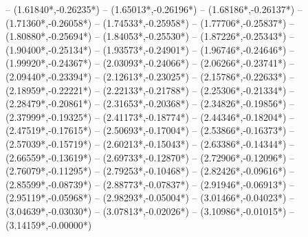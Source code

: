 {	-- ({1.61840*\dx},{-0.26235*\dy})
	-- ({1.65013*\dx},{-0.26196*\dy})
	-- ({1.68186*\dx},{-0.26137*\dy})
	-- ({1.71360*\dx},{-0.26058*\dy})
	-- ({1.74533*\dx},{-0.25958*\dy})
	-- ({1.77706*\dx},{-0.25837*\dy})
	-- ({1.80880*\dx},{-0.25694*\dy})
	-- ({1.84053*\dx},{-0.25530*\dy})
	-- ({1.87226*\dx},{-0.25343*\dy})
	-- ({1.90400*\dx},{-0.25134*\dy})
	-- ({1.93573*\dx},{-0.24901*\dy})
	-- ({1.96746*\dx},{-0.24646*\dy})
	-- ({1.99920*\dx},{-0.24367*\dy})
	-- ({2.03093*\dx},{-0.24066*\dy})
	-- ({2.06266*\dx},{-0.23741*\dy})
	-- ({2.09440*\dx},{-0.23394*\dy})
	-- ({2.12613*\dx},{-0.23025*\dy})
	-- ({2.15786*\dx},{-0.22633*\dy})
	-- ({2.18959*\dx},{-0.22221*\dy})
	-- ({2.22133*\dx},{-0.21788*\dy})
	-- ({2.25306*\dx},{-0.21334*\dy})
	-- ({2.28479*\dx},{-0.20861*\dy})
	-- ({2.31653*\dx},{-0.20368*\dy})
	-- ({2.34826*\dx},{-0.19856*\dy})
	-- ({2.37999*\dx},{-0.19325*\dy})
	-- ({2.41173*\dx},{-0.18774*\dy})
	-- ({2.44346*\dx},{-0.18204*\dy})
	-- ({2.47519*\dx},{-0.17615*\dy})
	-- ({2.50693*\dx},{-0.17004*\dy})
	-- ({2.53866*\dx},{-0.16373*\dy})
	-- ({2.57039*\dx},{-0.15719*\dy})
	-- ({2.60213*\dx},{-0.15043*\dy})
	-- ({2.63386*\dx},{-0.14344*\dy})
	-- ({2.66559*\dx},{-0.13619*\dy})
	-- ({2.69733*\dx},{-0.12870*\dy})
	-- ({2.72906*\dx},{-0.12096*\dy})
	-- ({2.76079*\dx},{-0.11295*\dy})
	-- ({2.79253*\dx},{-0.10468*\dy})
	-- ({2.82426*\dx},{-0.09616*\dy})
	-- ({2.85599*\dx},{-0.08739*\dy})
	-- ({2.88773*\dx},{-0.07837*\dy})
	-- ({2.91946*\dx},{-0.06913*\dy})
	-- ({2.95119*\dx},{-0.05968*\dy})
	-- ({2.98293*\dx},{-0.05004*\dy})
	-- ({3.01466*\dx},{-0.04023*\dy})
	-- ({3.04639*\dx},{-0.03030*\dy})
	-- ({3.07813*\dx},{-0.02026*\dy})
	-- ({3.10986*\dx},{-0.01015*\dy})
	-- ({3.14159*\dx},{-0.00000*\dy})
}
